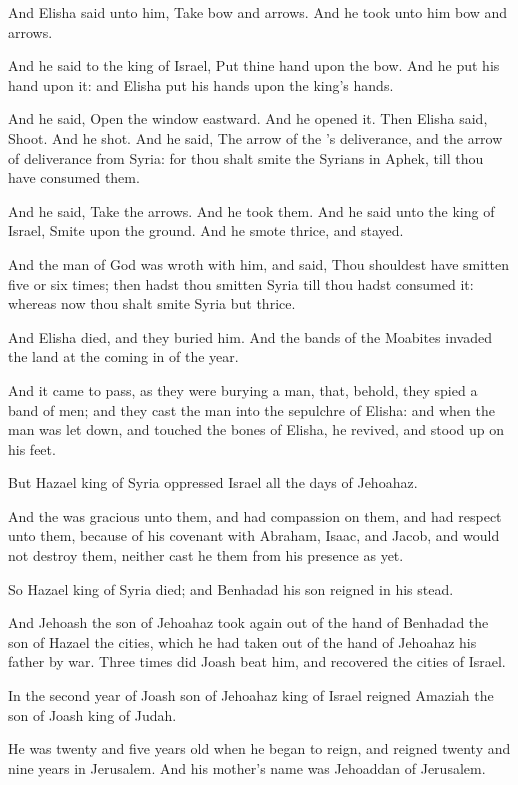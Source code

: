 \Verse And Elisha said unto him, Take bow and arrows. And he took unto him bow and arrows.

\Verse And he said to the king of Israel, Put thine hand upon the bow.  And he put his hand upon it: and Elisha put his hands upon the king's hands.

\Verse And he said, Open the window eastward. And he opened it. Then Elisha said, Shoot. And he shot. And he said, The arrow of the \LORD's deliverance, and the arrow of deliverance from Syria: for thou shalt smite the Syrians in Aphek, till thou have consumed them.

\Verse And he said, Take the arrows. And he took them. And he said unto the king of Israel, Smite upon the ground. And he smote thrice, and stayed.

\Verse And the man of God was wroth with him, and said, Thou shouldest have smitten five or six times; then hadst thou smitten Syria till thou hadst consumed it: whereas now thou shalt smite Syria but thrice.

\Verse And Elisha died, and they buried him. And the bands of the Moabites invaded the land at the coming in of the year.

\Verse And it came to pass, as they were burying a man, that, behold, they spied a band of men; and they cast the man into the sepulchre of Elisha: and when the man was let down, and touched the bones of Elisha, he revived, and stood up on his feet.

\Verse But Hazael king of Syria oppressed Israel all the days of Jehoahaz.

\Verse And the \LORD was gracious unto them, and had compassion on them, and had respect unto them, because of his covenant with Abraham, Isaac, and Jacob, and would not destroy them, neither cast he them from his presence as yet.

\Verse So Hazael king of Syria died; and Benhadad his son reigned in his stead.

\Verse And Jehoash the son of Jehoahaz took again out of the hand of Benhadad the son of Hazael the cities, which he had taken out of the hand of Jehoahaz his father by war. Three times did Joash beat him, and recovered the cities of Israel.


\Chapter
\Verse In the second year of Joash son of Jehoahaz king of Israel reigned Amaziah the son of Joash king of Judah.

\Verse He was twenty and five years old when he began to reign, and reigned twenty and nine years in Jerusalem. And his mother's name was Jehoaddan of Jerusalem.

